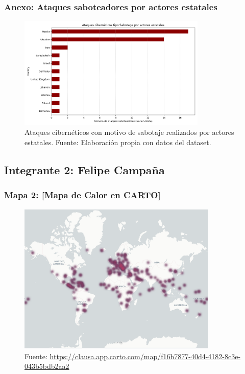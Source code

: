 \documentclass[12pt, a4paper]{article}
\begin{document}
\subsubsection*{Anexo: Ataques saboteadores por actores estatales}
\begin{figure}[H]
    \centering
    \includegraphics[width=0.8\textwidth]{images/sabotage_state.png}
    \caption{Ataques cibernéticos con motivo de sabotaje realizados por actores estatales. Fuente: Elaboración propia con datos del dataset.}
\end{figure}



\newpage
\subsection*{Integrante 2: Felipe Campaña}

\subsubsection*{Mapa 2: [Mapa de Calor en CARTO]}
\begin{figure}[H]
    \centering
    \includegraphics[width=0.85\textwidth]{images/Mapa_calor_FC.png}
    \caption[1]{Fuente: \url{https://clausa.app.carto.com/map/f16b7877-40d4-4182-8c3e-043b5bdb2aa2}}
\end{figure}
\end{document}
